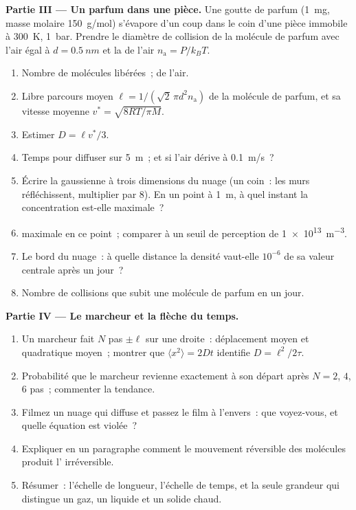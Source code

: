 \begin{problem}
\textbf{Partie III --- Un parfum dans une pièce.}
Une goutte de parfum (\qty{1}{mg}, masse molaire \qty{150}{g/mol}) s'évapore
d'un coup dans le coin d'une pièce immobile à \qty{300}{K}, \qty{1}{bar}.
Prendre le diamètre de collision de la molécule de parfum avec l'air égal à $d =
\qty{0.5}{nm}$ et la  de l'air $n_{\text{a}} = P/k_BT$.
\begin{enumerate}[resume]
  \item Nombre de molécules libérées~;  de l'air.
  \item Libre parcours moyen $\ell = 1/(\sqrt2\,\pi d^2 n_{\text{a}})$ de la
        molécule de parfum, et sa vitesse moyenne $v^* = \sqrt{8RT/\pi M}$.
  \item Estimer $D = \ell v^*/3$.
  \item Temps pour diffuser sur \qty{5}{m}~; et si l'air dérive à
        \qty{0.1}{m/s}~?
  \item Écrire la gaussienne à trois dimensions du nuage (un coin~:
        les murs réfléchissent, multiplier par $8$). En un point à \qty{1}{m},
        à quel instant la concentration est-elle maximale~?
  \item {} maximale en ce point~; comparer à un seuil de
        perception de \qty{1e13}{m^{-3}}.
  \item Le bord du nuage~: à quelle distance la densité vaut-elle $10^{-6}$ de
        sa valeur centrale après un jour~?
  \item Nombre de collisions que subit une molécule de parfum en un jour.
\end{enumerate}

\textbf{Partie IV --- Le marcheur et la flèche du temps.}
\begin{enumerate}[resume]
  \item Un marcheur fait $N$ pas $\pm\ell$ sur une droite~: déplacement moyen et
        quadratique moyen~; montrer que $\langle x^2\rangle = 2Dt$
        identifie $D = \ell^2/2\tau$.
  \item Probabilité que le marcheur revienne exactement à son départ après
        $N = 2$, $4$, $6$ pas~; commenter la tendance.
  \item Filmez un nuage qui diffuse et passez le film à l'envers~: que voyez-vous,
        et quelle équation est violée~?
  \item Expliquer en un paragraphe comment le mouvement réversible des molécules
        produit l' irréversible.
  \item Résumer~: l'échelle de longueur, l'échelle de temps, et la seule
        grandeur qui distingue un gaz, un liquide et un solide chaud.
\end{enumerate}
\end{problem}
